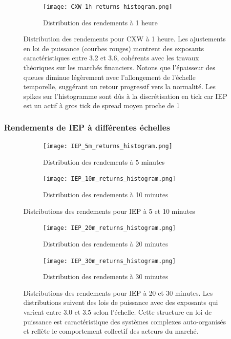 \documentclass[10pt,a4paper]{article}
\theoremstyle{definition}
\theoremstyle{remark}
\begin{document}
\begin{itemize}
\begin{figure}[H]
    \centering
    \begin{subfigure}[b]{0.45\textwidth}
        \texttt{[image: CXW\_1h\_returns\_histogram.png]}
        \caption{Distribution des rendements à 1 heure}
        \label{fig:CXW_1h_moved}
    \end{subfigure}
    \caption{Distribution des rendements pour CXW à 1 heure. Les ajustements en loi de puissance (courbes rouges) montrent des exposants caractéristiques entre 3.2 et 3.6, cohérents avec les travaux théoriques sur les marchés financiers. Notons que l'épaisseur des queues diminue légèrement avec l'allongement de l'échelle temporelle, suggérant un retour progressif vers la normalité. Les spikes sur l'histogramme sont dûs à la discrétisation en tick car IEP est un actif à gros tick de spread moyen proche de 1}
    \label{fig:CXW_multi_scale_moved}
\end{figure}

\subsubsection{Rendements de IEP à différentes échelles}

\begin{figure}[H]
    \centering
    \begin{subfigure}[b]{0.45\textwidth}
        \texttt{[image: IEP\_5m\_returns\_histogram.png]}
        \caption{Distribution des rendements à 5 minutes}
        \label{fig:IEP_5m_moved}
    \end{subfigure}
    \hfill
    \begin{subfigure}[b]{0.45\textwidth}
        \texttt{[image: IEP\_10m\_returns\_histogram.png]}
        \caption{Distribution des rendements à 10 minutes}
        \label{fig:IEP_10m_moved}
    \end{subfigure}
    \caption{Distributions des rendements pour IEP à 5 et 10 minutes}
\end{figure}

\begin{figure}[H]
    \centering
    \begin{subfigure}[b]{0.45\textwidth}
        \texttt{[image: IEP\_20m\_returns\_histogram.png]}
        \caption{Distribution des rendements à 20 minutes}
        \label{fig:IEP_20m_moved}
    \end{subfigure}
    \hfill
    \begin{subfigure}[b]{0.45\textwidth}
        \texttt{[image: IEP\_30m\_returns\_histogram.png]}
        \caption{Distribution des rendements à 30 minutes}
        \label{fig:IEP_30m_moved}
    \end{subfigure}
    \caption{Distributions des rendements pour IEP à 20 et 30 minutes. Les distributions suivent des lois de puissance avec des exposants qui varient entre 3.0 et 3.5 selon l'échelle. Cette structure en loi de puissance est caractéristique des systèmes complexes auto-organisés et reflète le comportement collectif des acteurs du marché.}
    \label{fig:IEP_multi_scale_moved}
\end{figure}


\end{itemize}
\end{document}
